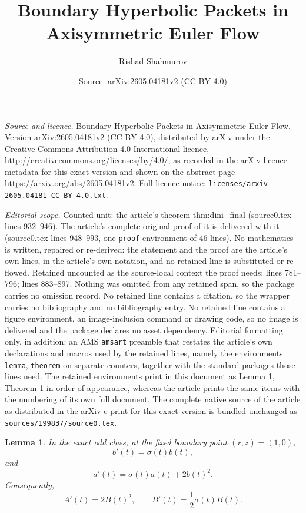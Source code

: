 \documentclass[10pt,a4paper]{amsart}
\title{Boundary Hyperbolic Packets in Axisymmetric Euler Flow}
\author{Rishad Shahmurov}
\date{Source: arXiv:2605.04181v2 (CC BY 4.0)}
\newtheorem{lemma}{Lemma}
\begin{document}
\maketitle

\noindent\emph{Source and licence.} Boundary Hyperbolic Packets in Axisymmetric Euler Flow. Version arXiv:2605.04181v2 (CC BY 4.0), distributed by arXiv under the Creative Commons Attribution 4.0 International licence, http://creativecommons.org/licenses/by/4.0/, as recorded in the arXiv licence metadata for this exact version and shown on the abstract page https://arxiv.org/abs/2605.04181v2. Full licence notice: \texttt{licenses/arxiv-2605.04181-CC-BY-4.0.txt}.\par\smallskip

\noindent\textit{Editorial scope.} Counted unit: the article's theorem thm:dini\_final (source0.tex lines 932--946). The article's complete original proof of it is delivered with it (source0.tex lines 948--993, one \texttt{proof} environment of 46 lines). No mathematics is written, repaired or re-derived: the statement and the proof are the article's own lines, in the article's own notation, and no retained line is substituted or re-flowed.  Retained uncounted as the source-local context the proof needs: lines 781--796; lines 883--897.  Nothing was omitted from any retained span, so the package carries no omission record.  No retained line contains a citation, so the wrapper carries no bibliography and no bibliography entry.  No retained line contains a figure environment, an image-inclusion command or drawing code, so no image is delivered and the package declares no asset dependency.  Editorial formatting only, in addition: an AMS \texttt{amsart} preamble that restates the article's own declarations and macros used by the retained lines, namely the environments \texttt{lemma}, \texttt{theorem} on separate counters, together with the standard packages those lines need.  The retained environments print in this document as Lemma 1, Theorem 1 in order of appearance, whereas the article prints the same items with the numbering of its own full document.  The complete native source of the article as distributed in the arXiv e-print for this exact version is bundled unchanged as \texttt{sources/199837/source0.tex}.
\begin{lemma}\label{lem:exact_odd_point_identities}
In the exact odd class, at the fixed boundary point \((r,z)=(1,0)\),
\begin{equation}\label{eq:b_exact_final}
b'(t)=\sigma(t)b(t),
\end{equation}
and
\begin{equation}\label{eq:a_exact_final}
a'(t)=\sigma(t)a(t)+2b(t)^2.
\end{equation}
Consequently,
\begin{equation}\label{eq:A_B_exact_final}
A'(t)=2B(t)^2,
\qquad
B'(t)=\frac12\sigma(t)B(t).
\end{equation}
\end{lemma}
\end{document}

